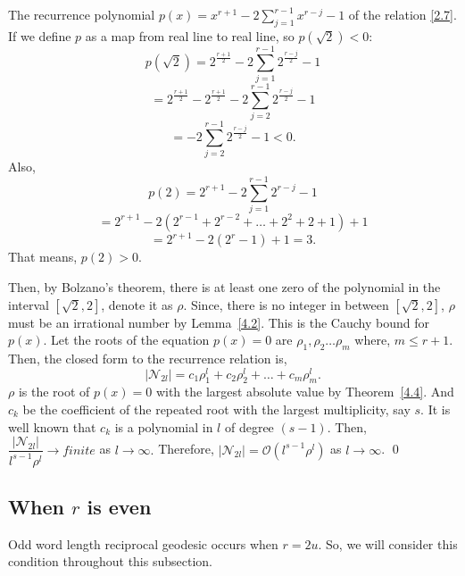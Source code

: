 \documentclass[11pt]{amsart}
\renewenvironment{proof}{{\bfseries Proof.}}{\qed}
\numberwithin{equation}{section}
\newtheorem{lemma}[theorem]{Lemma}
\theoremstyle{definition}
\newcommand{\thmref}[1]{Theorem~\ref{#1}}
\newcommand{\lemref}[1]{Lemma~\ref{#1}}
\numberwithin{equation}{section}
\begin{document}
		\begin{proof}
			The recurrence polynomial $p(x)= x^{r+1}-2\sum_{j=1}^{r-1}x^{r-j}-1$ of the relation \ref{2.7}. If we define $p$ as a map from real line to real line, so $p(\sqrt{2})<0$: 
			\[ p(\sqrt{2})=2^{\frac{r+1}{2}}-2\sum_{j=1}^{r-1}2^{\frac{r-j}{2}}-1\]
			\[=2^{\frac{r+1}{2}}-2^{\frac{r+1}{2}}-2\sum_{j=2}^{r-1}2^{\frac{r-j}{2}}-1\]
			\[=-2\sum_{j=2}^{r-1}2^{\frac{r-j}{2}}-1<0.\] 		
            Also, 
			\[p(2)= 2^{r+1}-2\sum_{j=1}^{r-1}2^{r-j}-1\]
			\[=2^{r+1}-2(2^{r-1}+2^{r-2}+\dots +2^{2}+2+1)+1\]
			\[=2^{r+1}-2(2^{r}-1)+1=3.\]
			That means, $p(2)>0.$
			
			Then, by Bolzano's theorem, there is at least one zero of the polynomial in the interval $[\sqrt{2},2]$, denote it as $\rho.$  Since, there is no integer in between $[\sqrt{2},2]$, $\rho$ must be an irrational number by \lemref{4.2}. This is the Cauchy bound for $p(x)$. Let the roots of the equation $p(x)=0$ are $ \rho_{1},\rho_{2}\dots \rho_{m} $ where, $ m\leq r+1 $.
			Then, the closed form to the recurrence relation is,
			\[|\mathcal{N}_{2l}|=c_{1}\rho_{1}^{l}+c_{2}\rho_{2}^{l}+\dots +c_{m}\rho_{m}^{l}. \]
			$\rho$ is the root of $p(x)=0$ with the largest absolute value by \thmref{4.4}. And $ c_{k} $ be the coefficient of the repeated root with the largest multiplicity,  say $s$. It is well known that $c_{k}$ is a polynomial in $l$ of degree $(s-1)$. Then, $\dfrac{|\mathcal{N}_{2l}|}{l^{s-1}\rho^{l}}\rightarrow finite$ as $l\rightarrow \infty.$ Therefore,  ${|\mathcal{N}_{2l}|}=\mathcal{O}({l^{s-1}\rho^{l}})$ as $l\rightarrow\infty$.
		\end{proof}
		\subsection{When $r$ is even }
		Odd word length reciprocal geodesic occurs when $r= 2u$. So, we will consider this condition throughout this subsection.
		
\end{document}
